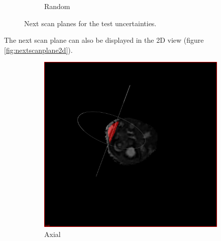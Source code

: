 \begin{figure}[H]
\begin{subfigure}[b]{0.5\textwidth}
    \caption{Random}
    \label{fig:nextscanplanerandom}  
  \end{subfigure}  
  \caption{Next scan planes for the test uncertainties.}\label{fig:nextscanplanetests}
\end{figure}

The next scan plane can also be displayed in the 2D view (figure \ref{fig:nextscanplane2d}).

\begin{figure}[H]
  \centering
  \begin{subfigure}[b]{0.3\textwidth}
    \includegraphics[width=\textwidth]{images/next_scan_plane/axial.png}
    \caption*{Axial}
    \label{fig:nextscanplaneaxial}
  \end{subfigure}%
  ~ %
  \begin{subfigure}[b]{0.3\textwidth}

\end{subfigure}
\end{figure}
